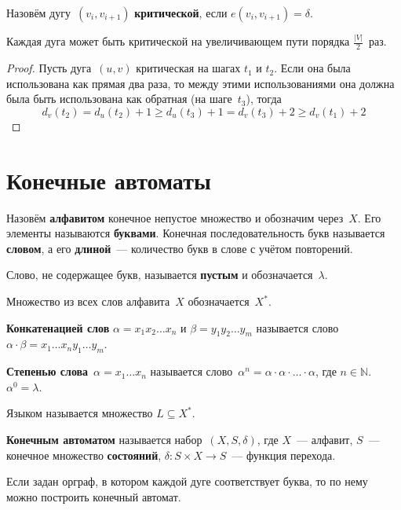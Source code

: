 Назовём дугу~$(v_i, v_{i+1})$ \textbf{критической}, если $e(v_i, v_{i+1}) = \delta$.

\begin{lemma}
Каждая дуга может быть критической на увеличивающем пути порядка $\frac{|V|}2$~раз.
\end{lemma}
\begin{proof}
Пусть дуга~$(u, v)$ критическая на шагах $t_1$ и $t_2$.
Если она была использована как прямая два раза, то между этими использованиями она должна была быть использована как обратная (на шаге~$t_3$), тогда
\begin{equation*}
d_v(t_2) = d_u(t_2) + 1 \geqslant
d_u(t_3) + 1 = d_v(t_3) + 2 \geqslant
d_v(t_1) + 2
\end{equation*}
\end{proof}

\section{Конечные автоматы}
Назовём \textbf{алфавитом} конечное непустое множество и обозначим через~$X$.
Его элементы называются \textbf{буквами}.
Конечная последовательность букв называется \textbf{словом}, а его \textbf{длиной}~--- количество букв в слове с учётом повторений.

Слово, не содержащее букв, называется \textbf{пустым} и обозначается~$\lambda$.

Множество из всех слов алфавита~$X$ обозначается~$X^*$.

\textbf{Конкатенацией слов} $\alpha = x_1 x_2 \ldots x_n$ и $\beta = y_1 y_2 \ldots y_m$ называется слово $\alpha \cdot \beta = x_1 \ldots x_n y_1 \ldots y_m$.

\textbf{Степенью слова}~$\alpha = x_1 \ldots x_n$ называется слово~$\alpha^n = \alpha \cdot \alpha \cdot \ldots \cdot \alpha$, где $n \in \mathbb N$.
$\alpha^0 = \lambda$.

Языком называется множество $L \subseteq X^*$.

\textbf{Конечным автоматом} называется набор~$(X, S, \delta)$, где $X$~--- алфавит, $S$~--- конечное множество \textbf{состояний}, $\delta \colon S \times X \to S$~--- функция перехода.

Если задан орграф, в котором каждой дуге соответствует буква, то по нему можно построить конечный автомат.
